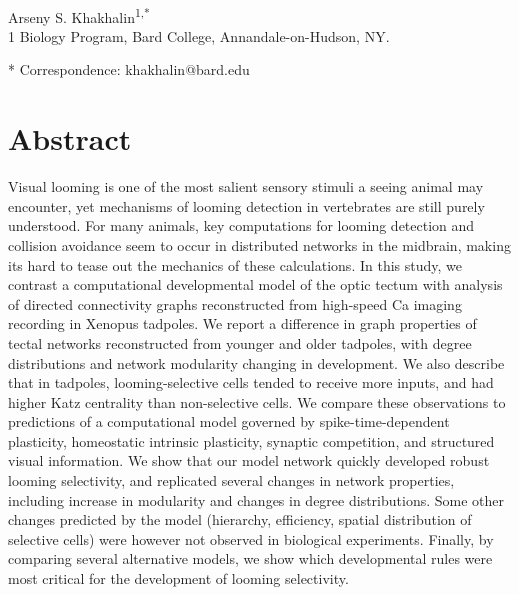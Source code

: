 \documentclass{article}
\begin{document}


\linenumbers %

\begin{flushleft}
{\Large
\textbf{}
}
\newline
\\
Arseny S. Khakhalin\textsuperscript{1,*}
\\
\bigskip
{1} Biology Program, Bard College, Annandale-on-Hudson, NY. 

* Correspondence: khakhalin@bard.edu

\section*{Abstract}
Visual looming is one of the most salient sensory stimuli a seeing animal may encounter, yet mechanisms of looming detection in vertebrates are still purely understood. For many animals, key computations for looming detection and collision avoidance seem to occur in distributed networks in the midbrain, making its hard to tease out the mechanics of these calculations. In this study, we contrast a computational developmental model of the optic tectum with analysis of directed connectivity graphs reconstructed from high-speed Ca imaging recording in Xenopus tadpoles. We report a difference in graph properties of tectal networks reconstructed from younger and older tadpoles, with degree distributions and network modularity changing in development. We also describe that in tadpoles, looming-selective cells tended to receive more inputs, and had higher Katz centrality than non-selective cells. We compare these observations to predictions of a computational model governed by spike-time-dependent plasticity, homeostatic intrinsic plasticity, synaptic competition, and structured visual information. We show that our model network quickly developed robust looming selectivity, and replicated several changes in network properties, including increase in modularity and changes in degree distributions. Some other changes predicted by the model (hierarchy, efficiency, spatial distribution of selective cells) were however not observed in biological experiments. Finally, by comparing several alternative models, we show which developmental rules were most critical for the development of looming selectivity.
\bigskip

\end{flushleft} %
\end{document}
